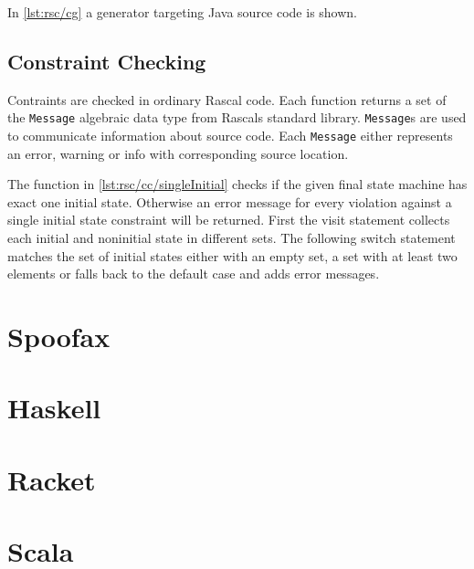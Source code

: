 In \autoref{lst:rsc/cg} a generator targeting Java source code is shown.



\subsection{Constraint Checking}

Contraints are checked in ordinary Rascal code.
Each function returns a set of the \lstinline{Message} algebraic data type from Rascals standard library.
\lstinline{Message}s are used to communicate information about source code.
Each \lstinline{Message} either represents an error, warning or info with corresponding source location.

The function in \autoref{lst:rsc/cc/singleInitial} checks if the given final state machine has exact one initial state.
Otherwise an error message for every violation against a single initial state constraint will be returned.
First the visit statement collects each initial and noninitial state in different sets.
The following switch statement matches the set of initial states either with an empty set, a set with at least two elements or falls back to the default case and adds error messages.











\section{Spoofax}

\section{Haskell}

\section{Racket}

\section{Scala}
